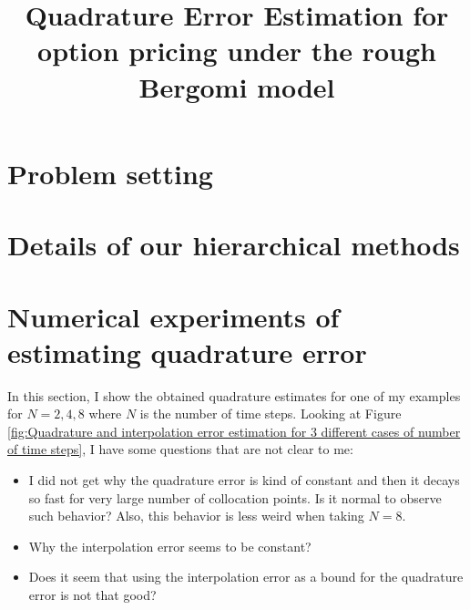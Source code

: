 \documentclass[11pt]{article}
\title{Quadrature Error Estimation  for option pricing under the rough Bergomi model}
\begin{document}
\section{Problem setting}\label{sec:Problem setting}


%
% 
\section{Details of our hierarchical methods}\label{sec:Details our approach and error bounds}


\section{Numerical experiments of estimating quadrature error}\label{sec:Numerical tests}
In this section, I show the obtained quadrature estimates for one of my examples for $N=2,4,8$ where $N$ is the number of time steps.  Looking at Figure \ref{fig:Quadrature and interpolation error estimation for 3 different cases of number of time steps}, I have some questions  that are not clear to me:
\begin{itemize}
\item I did not get why the quadrature error is kind of constant and then it decays so fast for very large number of collocation points. Is it normal to observe such behavior? Also, this behavior is less weird when taking $N=8$.

\item  Why the interpolation error seems to be constant?

\item Does it seem that using the interpolation error as a bound for the quadrature error is not that good?
\end{itemize}
\end{document}
